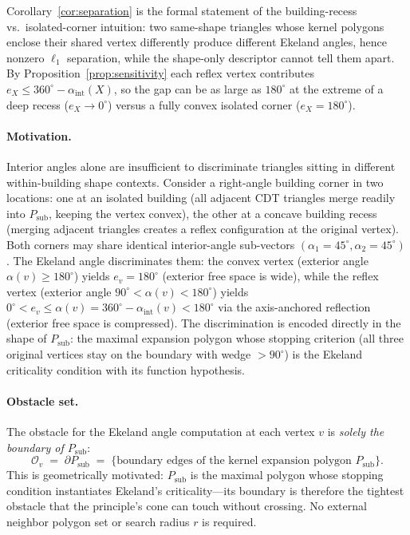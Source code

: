 \documentclass[10pt]{article}
\theoremstyle{plain}
\theoremstyle{definition}
\begin{document}
Corollary~\ref{cor:separation} is the formal statement of the
building-recess vs.\ isolated-corner intuition: two same-shape triangles whose
kernel polygons enclose their shared vertex differently produce different
Ekeland angles, hence nonzero $\ell_1$ separation, while the shape-only
descriptor cannot tell them apart. By Proposition~\ref{prop:sensitivity} each
reflex vertex contributes $e_X\le 360^\circ-\alpha_{\mathrm{int}}(X)$, so the
gap can be as large as $180^\circ$ at the extreme of a deep recess
($e_X\!\to\!0^\circ$) versus a fully convex isolated corner ($e_X=180^\circ$).


\paragraph{Motivation.}
Interior angles alone are insufficient to discriminate triangles sitting in
different within-building shape contexts.
Consider a right-angle building corner in two locations: one at an isolated
building (all adjacent CDT triangles merge readily into $P_{\mathrm{sub}}$,
keeping the vertex convex), the other at a concave building recess (merging
adjacent triangles creates a reflex configuration at the original vertex).
Both corners may share identical interior-angle sub-vectors
$(\alpha_1 = 45^\circ, \alpha_2 = 45^\circ)$.
The Ekeland angle discriminates them: the convex vertex (exterior angle
$\alpha(v) \ge 180^\circ$) yields $e_v = 180^\circ$ (exterior free space is wide),
while the reflex vertex (exterior angle $90^\circ<\alpha(v) < 180^\circ$) yields
$0^\circ<e_v \le \alpha(v) = 360^\circ - \alpha_{\mathrm{int}}(v) < 180^\circ$ via
the axis-anchored reflection (exterior free space is compressed).
The discrimination is encoded directly in the shape of $P_{\mathrm{sub}}$:
the maximal expansion polygon whose stopping criterion (all three original
vertices stay on the boundary with wedge ${>}90^\circ$) is the Ekeland
criticality condition with its function hypothesis.

\paragraph{Obstacle set.}
The obstacle for the Ekeland angle computation at each vertex $v$ is
\emph{solely the boundary of $P_{\mathrm{sub}}$}:
\begin{equation}
  \mathcal{O}_v \;=\; \partial P_{\mathrm{sub}}
  \;=\; \{\text{boundary edges of the kernel expansion polygon } P_{\mathrm{sub}}\}.
  \label{eq:obstacle}
\end{equation}
This is geometrically motivated: $P_{\mathrm{sub}}$ is the maximal polygon
whose stopping condition instantiates Ekeland's criticality---its boundary is
therefore the tightest obstacle that the principle's cone can touch without
crossing.
No external neighbor polygon set or search radius $r$ is required.
\end{document}
